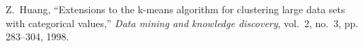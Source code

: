 \begin{thebibliography}{99}

Z.~Huang, ``Extensions to the k-means algorithm for clustering large data sets
  with categorical values,'' \emph{Data mining and knowledge discovery},
  vol.~2, no.~3, pp. 283--304, 1998.
\end{thebibliography}